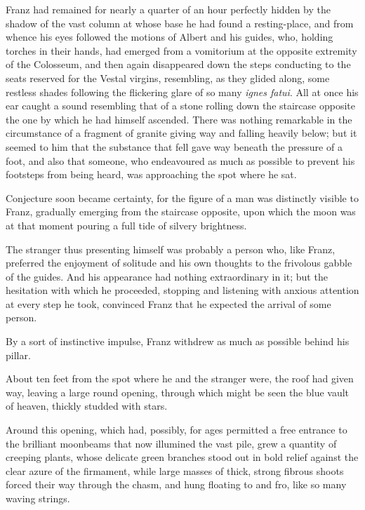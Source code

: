  Franz had remained for nearly a quarter of an hour perfectly hidden by the shadow of the vast column at whose base he had found a resting-place, and from whence his eyes followed the motions of Albert and his guides, who, holding torches in their hands, had emerged from a vomitorium at the opposite extremity of the Colosseum, and then again disappeared down the steps conducting to the seats reserved for the Vestal virgins, resembling, as they glided along, some restless shades following the flickering glare of so many \textit{ignes fatui}. All at once his ear caught a sound resembling that of a stone rolling down the staircase opposite the one by which he had himself ascended. There was nothing remarkable in the circumstance of a fragment of granite giving way and falling heavily below; but it seemed to him that the substance that fell gave way beneath the pressure of a foot, and also that someone, who endeavoured as much as possible to prevent his footsteps from being heard, was approaching the spot where he sat. 

 Conjecture soon became certainty, for the figure of a man was distinctly visible to Franz, gradually emerging from the staircase opposite, upon which the moon was at that moment pouring a full tide of silvery brightness. 

 The stranger thus presenting himself was probably a person who, like Franz, preferred the enjoyment of solitude and his own thoughts to the frivolous gabble of the guides. And his appearance had nothing extraordinary in it; but the hesitation with which he proceeded, stopping and listening with anxious attention at every step he took, convinced Franz that he expected the arrival of some person. 

 By a sort of instinctive impulse, Franz withdrew as much as possible behind his pillar. 

 About ten feet from the spot where he and the stranger were, the roof had given way, leaving a large round opening, through which might be seen the blue vault of heaven, thickly studded with stars. 

 Around this opening, which had, possibly, for ages permitted a free entrance to the brilliant moonbeams that now illumined the vast pile, grew a quantity of creeping plants, whose delicate green branches stood out in bold relief against the clear azure of the firmament, while large masses of thick, strong fibrous shoots forced their way through the chasm, and hung floating to and fro, like so many waving strings. 

